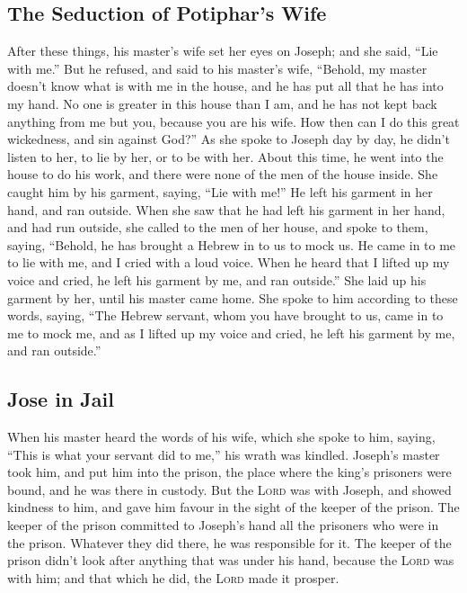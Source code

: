 \hypertarget{the-seduction-of-potiphars-wife}{%
\subsection{The Seduction of Potiphar's
Wife}\label{the-seduction-of-potiphars-wife}}

 After these things, his master's wife set her eyes on
Joseph; and she said, ``Lie with me.''  But he refused,
and said to his master's wife, ``Behold, my master doesn't know what is
with me in the house, and he has put all that he has into my hand.
 No one is greater in this house than I am, and he has not
kept back anything from me but you, because you are his wife. How then
can I do this great wickedness, and sin against God?'' 
As she spoke to Joseph day by day, he didn't listen to her, to lie by
her, or to be with her.  About this time, he went into
the house to do his work, and there were none of the men of the house
inside.  She caught him by his garment, saying, ``Lie
with me!'' He left his garment in her hand, and ran outside.
 When she saw that he had left his garment in her hand,
and had run outside,  she called to the men of her house,
and spoke to them, saying, ``Behold, he has brought a Hebrew in to us to
mock us. He came in to me to lie with me, and I cried with a loud voice.
 When he heard that I lifted up my voice and cried, he
left his garment by me, and ran outside.''  She laid up
his garment by her, until his master came home.  She
spoke to him according to these words, saying, ``The Hebrew servant,
whom you have brought to us, came in to me to mock me, 
and as I lifted up my voice and cried, he left his garment by me, and
ran outside.''

\hypertarget{jose-in-jail}{%
\subsection{Jose in Jail}\label{jose-in-jail}}

 When his master heard the words of his wife, which she
spoke to him, saying, ``This is what your servant did to me,'' his wrath
was kindled.  Joseph's master took him, and put him into
the prison, the place where the king's prisoners were bound, and he was
there in custody.  But the \textsc{Lord} was with Joseph,
and showed kindness to him, and gave him favour in the sight of the
keeper of the prison.  The keeper of the prison committed
to Joseph's hand all the prisoners who were in the prison. Whatever they
did there, he was responsible for it.  The keeper of the
prison didn't look after anything that was under his hand, because the
\textsc{Lord} was with him; and that which he did, the \textsc{Lord}
made it prosper.

